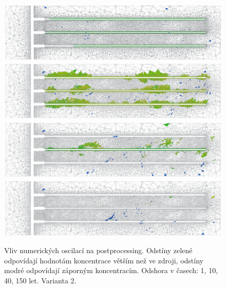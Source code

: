 \documentclass[11pt,a4paper]{article}
\begin{document}
\begin{onehalfspacing}
\begin{figure}[H]
\centering
\includegraphics[width=16cm]{graphics/obr_ralek/var2/oscilace/slice01a.png}
\includegraphics[width=16cm]{graphics/obr_ralek/var2/oscilace/slice10a.png}
\includegraphics[width=16cm]{graphics/obr_ralek/var2/oscilace/slice40a.png}
\includegraphics[width=16cm]{graphics/obr_ralek/var2/oscilace/slice150a.png}
\caption{Vliv numerických oscilací na postprocessing. Odstíny zelené odpovídají hodnotám koncentrace větším než ve zdroji, odstíny modré odpovídají záporným koncentracím. Odshora v časech: 1, 10, 40, 150 let. Varianta 2.}
\end{figure}


\end{onehalfspacing}
\end{document}
